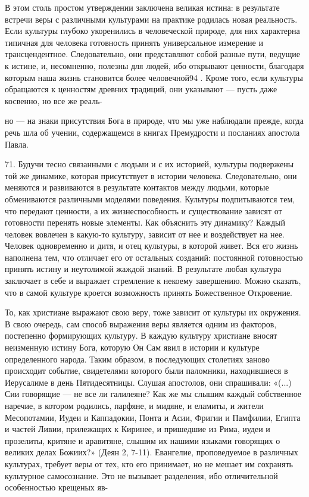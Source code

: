 \documentclass[a5paper,10pt]{article}
\begin{document}
В этом столь простом утверждении заключена великая истина: в результате встречи
веры с различными культурами на практике родилась новая реальность. Если
культуры глубоко укоренились в человеческой природе, для них характерна
типичная для человека готовность принять универсальное измерение и
трансцендентное. Следовательно, они представляют собой разные пути, ведущие к
истине, и, несомненно, полезны для людей, ибо открывают ценности, благодаря
которым наша жизнь становится более человечной94 . Кроме того, если культуры
обращаются к ценностям древних традиций, они указывают — пусть даже косвенно,
но все же реаль-

но — на знаки присутствия Бога в природе, что мы уже наблюдали прежде, когда
речь шла об учении, содержащемся в книгах Премудрости и посланиях апостола
Павла.

71. Будучи тесно связанными с людьми и с их историей, культуры подвержены той
же динамике, которая присутствует в истории человека. Следовательно, они
меняются и развиваются в результате контактов между людьми, которые
обмениваются различными моделями поведения. Культуры подпитываются тем, что
передают ценности, а их жизнеспособность и существование зависят от готовности
перенять новые элементы. Как объяснить эту динамику? Каждый человек вовлечен в
какую-то культуру, зависит от нее и воздействует на нее. Человек одновременно и
дитя, и отец культуры, в которой живет. Вся его жизнь наполнена тем, что
отличает его от остальных созданий: постоянной готовностью принять истину и
неутолимой жаждой знаний. В результате любая культура заключает в себе и
выражает стремление к некоему завершению. Можно сказать, что в самой культуре
кроется возможность принять Божественное Откровение.

То, как христиане выражают свою веру, тоже зависит от культуры их окружения. В
свою очередь, сам способ выражения веры является одним из факторов, постепенно
формирующих культуру. В каждую культуру христиане вносят неизменную истину
Бога, которую Он Сам явил в истории и культуре определенного народа. Таким
образом, в последующих столетиях заново происходит событие, свидетелями
которого были паломники, находившиеся в Иерусалиме в день Пятидесятницы. Слушая
апостолов, они спрашивали: «(...) Сии говорящие — не все ли галилеяне? Как же
мы слышим каждый собственное наречие, в котором родились, парфяне, и мидяне, и
еламиты, и жители Месопотамии, Иудеи и Каппадокии, Понта и Асии, Фригии и
Памфилии, Египта и частей Ливии, прилежащих к Киринее, и пришедшие из Рима,
иудеи и прозелиты, критяне и аравитяне, слышим их нашими языками говорящих о
великих делах Божиих?» (Деян 2, 7-11). Евангелие, проповедуемое в различных
культурах, требует веры от тех, кто его принимает, но не мешает им сохранять
культурное самосознание. Это не вызывает разделения, ибо отличительной
особенностью крещеных яв-
\end{document}
